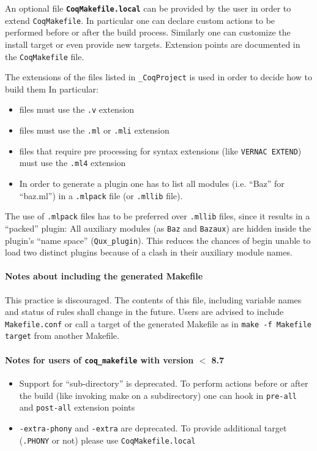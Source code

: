An optional file {\bf {\tt CoqMakefile.local}} can be provided by the user in order to extend {\tt CoqMakefile}.  In particular one can declare custom actions to be performed before or after the build process. Similarly one can customize the install target or even provide new targets.  Extension points are documented in the {\tt CoqMakefile} file.

The extensions of the files listed in {\tt \_CoqProject} is
used in order to decide how to build them  In particular:

\begin{itemize}
\item {\Coq} files must use the \texttt{.v} extension
\item {\ocaml} files must use the \texttt{.ml} or \texttt{.mli} extension
\item {\ocaml} files that require pre processing for syntax extensions (like {\tt VERNAC EXTEND}) must use the \texttt{.ml4} extension
\item In order to generate a plugin one has to list all {\ocaml} modules (i.e. ``Baz'' for ``baz.ml'') in a \texttt{.mlpack} file (or \texttt{.mllib} file).
\end{itemize}

The use of \texttt{.mlpack} files has to be preferred over \texttt{.mllib}
files, since it results in a ``packed'' plugin: All auxiliary 
modules (as {\tt Baz} and {\tt Bazaux}) are hidden inside
the plugin's ``name space'' ({\tt Qux\_plugin}).
This reduces the chances of begin unable to load two distinct plugins
because of a clash in their auxiliary module names.

\paragraph{Notes about including the generated Makefile}

This practice is discouraged. The contents of this file, including variable names
and status of rules shall change in the future.  Users are advised to
include {\tt Makefile.conf} or call a target of the generated Makefile
as in {\tt make -f Makefile target} from another Makefile.

\paragraph{Notes for users of {\tt coq\_makefile} with version $<$ 8.7}

\begin{itemize}
\item Support for ``sub-directory'' is deprecated.  To perform actions before
	or after the build (like invoking make on a subdirectory) one can
	hook in {\tt pre-all} and {\tt post-all} extension points
\item \texttt{-extra-phony} and \texttt{-extra} are deprecated.  To provide
	additional target ({\tt .PHONY} or not) please use 
	{\tt CoqMakefile.local}
\end{itemize}

